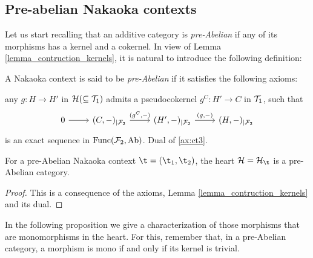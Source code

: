 \subsection{Pre-abelian Nakaoka contexts}

Let us start recalling that an additive category is  {\em pre-Abelian} if any of its morphisms has a kernel and a cokernel. In view of  Lemma \ref{lemma_contruction_kernels}, it is natural to introduce the following definition:

\begin{definition}
A Nakaoka context is said to be {\em pre-Abelian} if it satisfies the following axioms:
\begin{torsionaxioms}\setcounter{enumi}{2}
\item\label{ax:ct3} any  $g\colon H\to H'$ in $\mathcal H(\subseteq \mathcal T_1)$ admits a pseudocokernel $g^C\colon H'\to C$ in $\mathcal T_1$, such that
\begin{equation*}
\begin{tikzcd}
0\arrow{r} &(C,-)_{|\mathcal{F}_2}\arrow{r}{(g^C,-)} & (H',-)_{|\mathcal{F}_2}\arrow{r}{(g,-)}& (H,-)_{|\mathcal{F}_2}
\end{tikzcd}
\end{equation*}
is an exact sequence in $\mathrm{Func}(\mathcal F_2,\mathrm{Ab})$. 
\varitem{^\ast}\label{ax:ct3op} Dual of \ref{ax:ct3}.
\end{torsionaxioms}
\end{definition}



\begin{thm}
For a pre-Abelian Nakaoka context $\t=(\t_1,\t_2)$, the heart $\H=\H_\t$ is a pre-Abelian category.
\end{thm}
\begin{proof}
This is a consequence of the axioms, Lemma \ref{lemma_contruction_kernels} and its dual.
\end{proof}

In the following proposition we give a characterization of those morphisms that are monomorphisms in the heart. For this, remember that, in a pre-Abelian category, a morphism is mono if and only if its kernel is trivial. 

